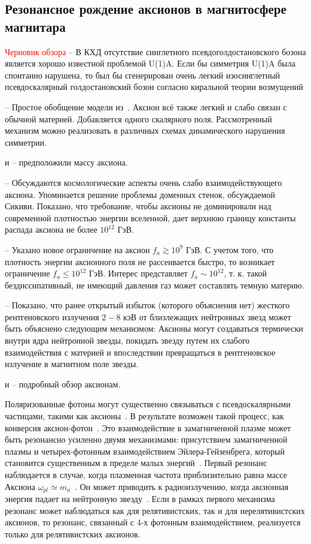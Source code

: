 \subsection{Резонансное рождение аксионов в магнитосфере магнитара}
\textcolor{red}{Черновик обзора}
\cite{Weinberg:1975} -- В КХД отсутствие синглетного псевдоголдостановского 
бозона является хорошо известной проблемой U(1)A. Если бы симметрия U(1)A была 
спонтанно нарушена, то был бы сгенерирован очень легкий изосинглетный 
псевдоскалярный голдостановский бозон согласно киральной теории возмущений

\cite{Dine:1981} -- Простое обобщение модели из~\cite{Quinn:1977}. Аксион всё также легкий и слабо связан с обычной материей. Добавляется одного скалярного поля. Рассмотренный механизм можно реализовать в различных схемах динамического нарушения симметрии.

\cite{Weinberg:1978} и \cite{Wilczek:1978} -- предположили массу аксиона.

\cite{Dine:1983} -- Обсуждаются космологические аспекты очень слабо взаимодействующего аксиона. Упоминается решение проблемы доменных стенок, обсуждаемой Сикиви. Показано, что требование, чтобы аксионы не доминировали над современной плотностью энергии вселенной, дает верхнюю границу константы распада аксиона не более $10^{12}$ ГэВ.

\cite{Preskill:1983} -- Указано новое ограничение на аксион $f_a\gtrsim 10^9$ ГэВ. С учетом того, что плотность энергии аксионного поля не рассеивается быстро, то возникает ограничение $f_a\leqslant10^{12}$ ГэВ. Интерес представляет $f_a\sim 10^{12}$, т. к. такой бездиссипативный, не имеющий давления газ может составлять темную материю.

\cite{Buschmann:2021} -- Показано, что ранее открытый избыток (которого объяснения нет) жесткого рентгеновского излучения $2-8$ кэВ от близлежащих нейтронных звезд может быть объяснено следующим механизмом: Аксионы могут создаваться термически внутри ядра нейтронной звезды, покидать звезду путем их слабого взаимодействия с материей и впоследствии превращаться в рентгеновское излучение в магнитном поле звезды.

\cite{Kim:2010} и \cite{Marsh:2016} -- подробный обзор аксионам.

Поляризованные фотоны могут существенно связываться с псевдоскалярными частицами, такими как аксионы~\cite{Sikivie:1983}. В результате возможен такой процесс, как конверсия аксион-фотон~\cite{Raffelt:1988}. Это взаимодействие в замагниченной плазме может быть резонансно усиленно двумя механизмами: присутствием замагниченной плазмы и четырех-фотонным взаимодействием Эйлера-Гейзенбрега, который становится существенным в пределе малых энергий~\cite{Lai:2006}. Первый резонанс наблюдается в случае, когда плазменная частота приблизительно равна массе Аксиона $\omega_{pl}\simeq m_a$~\cite{Yanagida:1988}. Он может приводить к радиоизлучению, когда аксионная энергия падает на нейтронную звезду~\cite{Pshirkov:2009}. Если в рамках первого механизма резонанс может наблюдаться как для релятивистских, так и для нерелятивистских аксионов, то резонанс, связанный с 4-х фотонным взаимодействием, реализуется только для релятивистских аксионов.

